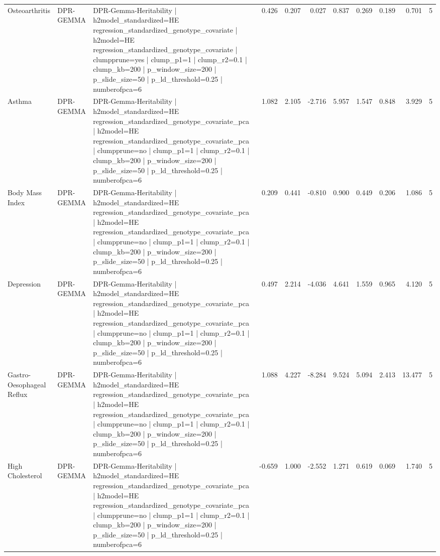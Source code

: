 \begin{landscape}
\begin{longtable}{p{2.4cm}p{1.8cm}p{6.0cm}rrrrrrrr}
Osteoarthritis & DPR-GEMMA & DPR-Gemma-Heritability | h2model\_standardized=HE regression\_standardized\_genotype\_covariate | h2model=HE regression\_standardized\_genotype\_covariate | clumpprune=yes | clump\_p1=1 | clump\_r2=0.1 | clump\_kb=200 | p\_window\_size=200 | p\_slide\_size=50 | p\_ld\_threshold=0.25 | numberofpca=6 & 0.426 & 0.207 & 0.027 & 0.837 & 0.269 & 0.189 & 0.701 & 5 \\
Asthma & DPR-GEMMA & DPR-Gemma-Heritability | h2model\_standardized=HE regression\_standardized\_genotype\_covariate\_pca | h2model=HE regression\_standardized\_genotype\_covariate\_pca | clumpprune=no | clump\_p1=1 | clump\_r2=0.1 | clump\_kb=200 | p\_window\_size=200 | p\_slide\_size=50 | p\_ld\_threshold=0.25 | numberofpca=6 & 1.082 & 2.105 & -2.716 & 5.957 & 1.547 & 0.848 & 3.929 & 5 \\
Body Mass Index & DPR-GEMMA & DPR-Gemma-Heritability | h2model\_standardized=HE regression\_standardized\_genotype\_covariate\_pca | h2model=HE regression\_standardized\_genotype\_covariate\_pca | clumpprune=no | clump\_p1=1 | clump\_r2=0.1 | clump\_kb=200 | p\_window\_size=200 | p\_slide\_size=50 | p\_ld\_threshold=0.25 | numberofpca=6 & 0.209 & 0.441 & -0.810 & 0.900 & 0.449 & 0.206 & 1.086 & 5 \\
Depression & DPR-GEMMA & DPR-Gemma-Heritability | h2model\_standardized=HE regression\_standardized\_genotype\_covariate\_pca | h2model=HE regression\_standardized\_genotype\_covariate\_pca | clumpprune=no | clump\_p1=1 | clump\_r2=0.1 | clump\_kb=200 | p\_window\_size=200 | p\_slide\_size=50 | p\_ld\_threshold=0.25 | numberofpca=6 & 0.497 & 2.214 & -4.036 & 4.641 & 1.559 & 0.965 & 4.120 & 5 \\
Gastro-Oesophageal Reflux & DPR-GEMMA & DPR-Gemma-Heritability | h2model\_standardized=HE regression\_standardized\_genotype\_covariate\_pca | h2model=HE regression\_standardized\_genotype\_covariate\_pca | clumpprune=no | clump\_p1=1 | clump\_r2=0.1 | clump\_kb=200 | p\_window\_size=200 | p\_slide\_size=50 | p\_ld\_threshold=0.25 | numberofpca=6 & 1.088 & 4.227 & -8.284 & 9.524 & 5.094 & 2.413 & 13.477 & 5 \\
High Cholesterol & DPR-GEMMA & DPR-Gemma-Heritability | h2model\_standardized=HE regression\_standardized\_genotype\_covariate\_pca | h2model=HE regression\_standardized\_genotype\_covariate\_pca | clumpprune=no | clump\_p1=1 | clump\_r2=0.1 | clump\_kb=200 | p\_window\_size=200 | p\_slide\_size=50 | p\_ld\_threshold=0.25 | numberofpca=6 & -0.659 & 1.000 & -2.552 & 1.271 & 0.619 & 0.069 & 1.740 & 5 \\

\end{longtable}
\end{landscape}

